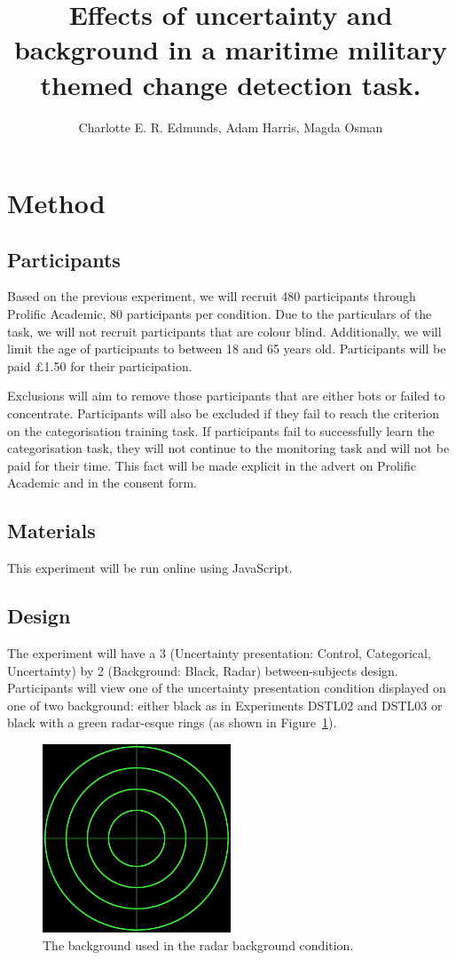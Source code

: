\documentclass[doc, a4paper, apacite]{apa6}
\title{Effects of uncertainty and background in a maritime military themed change detection task.}
\author{Charlotte E. R. Edmunds, Adam Harris, Magda Osman}
\affiliation{Queen Mary, UCL, University of London \\ 1 December 2020}
\begin{document}
\maketitle
\doublespacing

\section{Method}
\subsection{Participants}
Based on the previous experiment, we will recruit 480 participants through Prolific Academic, 80 participants per condition. 
Due to the particulars of the task, we will not recruit participants that are colour blind. 
Additionally, we will limit the age of participants to between 18 and 65 years old. 
Participants will be paid \pounds1.50 for their participation. 

Exclusions will aim to remove those participants that are either bots or failed to concentrate. 
Participants will also be excluded if they fail to reach the criterion on the categorisation training task. 
If participants fail to successfully learn the categorisation task, they will not continue to the monitoring task and will not be paid for their time. 
This fact will be made explicit in the advert on Prolific Academic and in the consent form. 

\subsection{Materials}
This experiment will be run online using JavaScript. 

\subsection{Design}
The experiment will have a 3 (Uncertainty presentation: Control, Categorical, Uncertainty) by 2 (Background: Black, Radar) between-subjects design. 
Participants will view one of the uncertainty presentation condition displayed on one of two background: either black as in Experiments DSTL02 and DSTL03 or black with a green radar-esque rings (as shown in Figure~\ref{fig:radar}). 

\begin{figure}
	\centering
	\includegraphics[width=0.5\textwidth]{images/radar.jpg}
	\caption{The background used in the radar background condition.}
	\label{fig:radar}
\end{figure}
\end{document}
